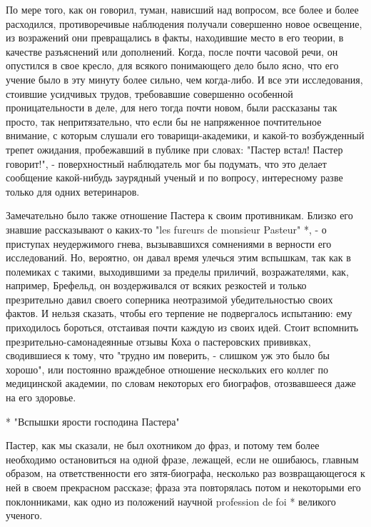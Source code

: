 По мере того, как он говорил, туман, нависший над вопросом, все более  и
более расходился,  противоречивые наблюдения  получали совершенно  новое
освещение, из возражений  они превращались в  факты, находившие место  в
его теории, в  качестве разъяснений или  дополнений. Когда, после  почти
часовой речи, он опустился в  свое кресло, для всякого понимающего  дело
было  ясно,  что  его  учение  было  в  эту  минуту  более  сильно,  чем
когда-либо.  И  все   эти  исследования,   стоившие  усидчивых   трудов,
требовавшие совершенно особенной проницательности в деле, для него тогда
почти новом, были рассказаны так  просто, так непритязательно, что  если
бы  не  напряженное  почтительное   внимание,  с  которым  слушали   его
товарищи-академики, и какой-то возбужденный трепет ожидания, пробежавший
в публике при словах: "Пастер  встал! Пастер говорит!", -  поверхностный
наблюдатель мог  бы  подумать,  что это  делает  сообщение  какой-нибудь
заурядный ученый  и  по  вопросу, интересному  разве  только  для  одних
ветеринаров.

Замечательно было также  отношение Пастера к  своим противникам.  Близко
его знавшие рассказывают о каких-то "les fureurs de monsieur Pasteur" *,
- о приступах неудержимого гнева, вызывавшихся сомнениями в верности его
исследований. Но, вероятно,  он давал время  улечься этим вспышкам,  так
как  в   полемиках   с   такими,  выходившими   за   пределы   приличий,
возражателями, как,  например,  Брефельд,  он  воздерживался  от  всяких
резкостей и  только  презрительно  давил  своего  соперника  неотразимой
убедительностью своих фактов.  И нельзя сказать,  чтобы его терпение  не
подвергалось испытанию: ему приходилось бороться, отстаивая почти каждую
из своих идей. Стоит вспомнить презрительно-самонадеянные отзывы Коха  о
пастеровских прививках, сводившиеся к тому,  что "трудно им поверить,  -
слишком уж  это  было бы  хорошо",  или постоянно  враждебное  отношение
нескольких его коллег по медицинской  академии, по словам некоторых  его
биографов, отозвавшееся даже на его здоровье.

* "Вспышки ярости господина Пастера"

Пастер, как мы  сказали, не был  охотником до фраз,  и потому тем  более
необходимо остановиться  на  одной  фразе, лежащей,  если  не  ошибаюсь,
главным образом,  на ответственности  его зятя-биографа,  несколько  раз
возвращающегося к ней в своем прекрасном рассказе; фраза эта повторялась
потом и  некоторыми  его поклонниками,  как  одно из  положений  научной
profession de foi * великого ученого.

